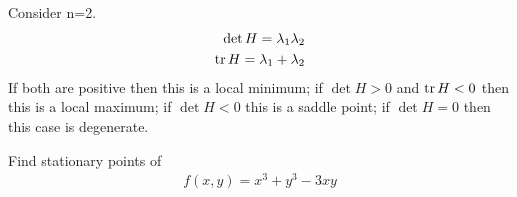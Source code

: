 \documentclass[a4paper]{article}
\begin{document}
\begin{eg}
Consider n=2.
\begin{equation*}
\begin{aligned}
\det H = \lambda_1 \lambda_2\\
\operatorname{tr} H = \lambda_1 + \lambda_2
\end{aligned}
\end{equation*}
If both are positive then this is a local minimum; if $\det H>0$ and $\operatorname{tr} H<0$ then this is a local maximum; if $\det H<0$ this is a saddle point; if $\det H=0$ then this case is degenerate.
\end{eg}

\begin{eg}
Find stationary points of 
\begin{equation*}
\begin{aligned}
f\left(x,y\right) = x^3+y^3-3xy
\end{aligned}
\end{equation*}
\end{eg}
\end{document}
